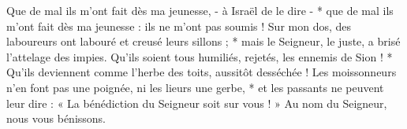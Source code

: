 Que de mal ils m'ont fait dès ma jeunesse, - à Israël de le dire - *
\versseparator
que de mal ils m'ont fait dès ma jeunesse : ils ne m'ont pas soumis !
\versseparator
Sur mon dos, des laboureurs ont labouré et creusé leurs sillons ; *
\versseparator
mais le Seigneur, le juste, a brisé l'attelage des impies.
\versseparator
Qu'ils soient tous humiliés, rejetés, les ennemis de Sion ! *
\versseparator
Qu'ils deviennent comme l'herbe des toits, aussitôt desséchée !
\versseparator
Les moissonneurs n'en font pas une poignée, ni les lieurs une gerbe, *
\versseparator
et les passants ne peuvent leur dire : « La bénédiction du Seigneur soit sur vous ! » Au nom du Seigneur, nous vous bénissons.
